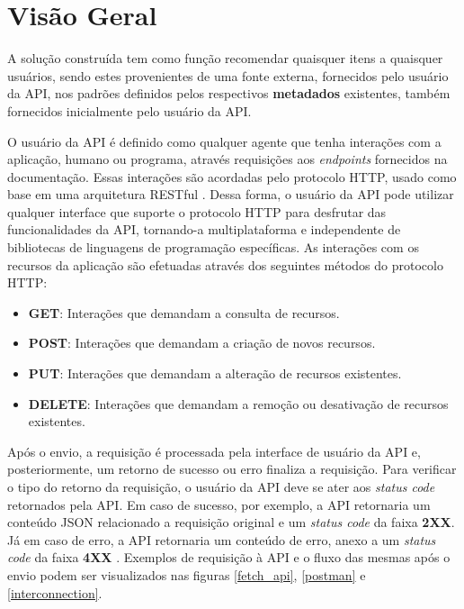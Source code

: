 \documentclass[12pt, openright, oneside, a4paper, brazil]{abntex2}
\begin{document}
\section{Visão Geral} \label{visao_geral}

A solução construída tem como função recomendar quaisquer itens a quaisquer usuários, sendo estes provenientes de uma fonte externa, fornecidos pelo usuário da API, nos padrões definidos pelos respectivos \textbf{metadados} existentes, também fornecidos inicialmente pelo usuário da API.

O usuário da API é definido como qualquer agente que tenha interações com a aplicação, humano ou programa, através requisições aos \textit{endpoints} fornecidos na documentação. Essas interações são acordadas pelo protocolo HTTP, usado como base em uma arquitetura RESTful \cite{rodriguez2008restful}. Dessa forma, o usuário da API pode utilizar qualquer interface que suporte o protocolo HTTP para desfrutar das funcionalidades da API, tornando-a multiplataforma e independente de bibliotecas de linguagens de programação específicas. As interações com os recursos da aplicação são efetuadas através dos seguintes métodos do protocolo HTTP:

\begin{itemize}

	\item \textbf{GET}: Interações que demandam a consulta de recursos.

	\item \textbf{POST}: Interações que demandam a criação de novos recursos.

	\item \textbf{PUT}: Interações que demandam a alteração de recursos existentes.

	\item \textbf{DELETE}: Interações que demandam a remoção ou desativação de recursos existentes.

\end{itemize}

Após o envio, a requisição é processada pela interface de usuário da API e, posteriormente, um retorno de sucesso ou erro finaliza a requisição. Para verificar o tipo do retorno da requisição, o usuário da API deve se ater aos \textit{status code} retornados pela API. Em caso de sucesso, por exemplo, a API retornaria um conteúdo JSON relacionado a requisição original e um \textit{status code} da faixa \textbf{2XX}. Já em caso de erro, a API retornaria um conteúdo de erro, anexo a um \textit{status code} da faixa \textbf{4XX} \cite{fielding1999hypertext}. Exemplos de requisição à API e o fluxo das mesmas após o envio podem ser visualizados nas figuras \ref{fetch_api}, \ref{postman} e \ref{interconnection}.
\end{document}
